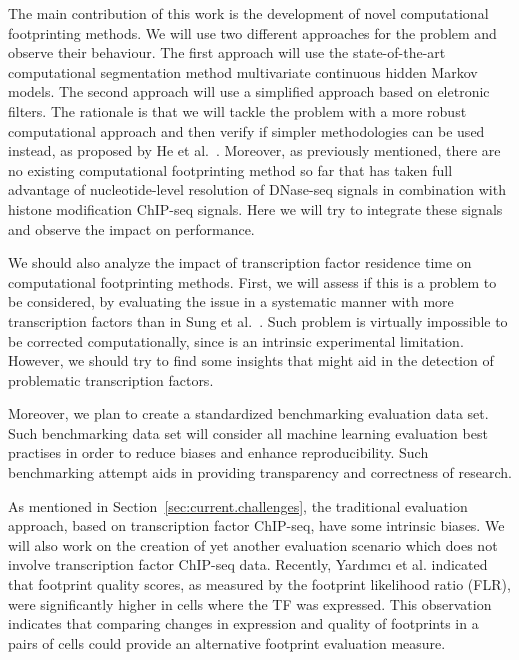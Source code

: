 The main contribution of this work is the development of novel computational footprinting methods. We will use two different approaches for the problem and observe their behaviour. The first approach will use the state-of-the-art computational segmentation method multivariate continuous hidden Markov models. The second approach will use a simplified approach based on eletronic filters. The rationale is that we will tackle the problem with a more robust computational approach and then verify if simpler methodologies can be used instead, as proposed by He et al.~\cite{he2014}. Moreover, as previously mentioned, there are no existing computational footprinting method so far that has taken full advantage of nucleotide-level resolution of DNase-seq signals in combination with histone modification ChIP-seq signals. Here we will try to integrate these signals and observe the impact on performance.

We should also analyze the impact of transcription factor residence time on computational footprinting methods. First, we will assess if this is a problem to be considered, by evaluating the issue in a systematic manner with more transcription factors than in Sung et al.~\cite{sung2014}. Such problem is virtually impossible to be corrected computationally, since is an intrinsic experimental limitation. However, we should try to find some insights that might aid in the detection of problematic transcription factors.

Moreover, we plan to create a standardized benchmarking evaluation data set. Such benchmarking data set will consider all machine learning evaluation best practises in order to reduce biases and enhance reproducibility. Such benchmarking attempt aids in providing transparency and correctness of research.

As mentioned in Section~\ref{sec:current.challenges}, the traditional evaluation approach, based on transcription factor ChIP-seq, have some intrinsic biases. We will also work on the creation of yet another evaluation scenario which does not involve transcription factor ChIP-seq data. Recently, Yard{\i}mc{\i} et al.\cite{yardimci2014} indicated that footprint quality scores, as measured by the footprint likelihood ratio (FLR), were significantly higher in cells where the TF was expressed. This observation indicates that comparing changes in expression and quality of footprints in a pairs of cells could provide an alternative footprint evaluation measure.


